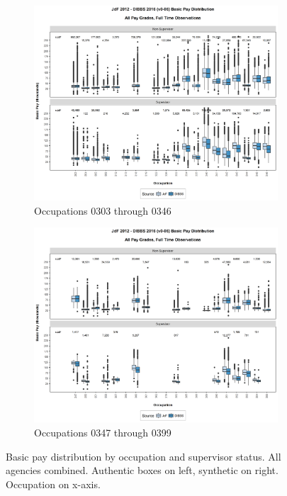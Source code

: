 \documentclass[10pt, letterpaper]{article}
\begin{document}
\begin{spacing}{1.0}
\clearpage

\begin{figure}[h]
    \centering
    \begin{subfigure}{1\textwidth}
        \centering
        \includegraphics[width=6in, trim={0 1in 0 0.75in}, clip]{JdFDIBBSBasicPaySupervisoryStatusOccupation81.png}
        \caption{Occupations 0303 through 0346}
        \vspace{10pt}
    \end{subfigure}
    \begin{subfigure}{1\textwidth}
        \centering
        \includegraphics[width=6in, trim={0 1in 0 0.75in}, clip]{JdFDIBBSBasicPaySupervisoryStatusOccupation101.png}
        \caption{Occupations 0347 through 0399}
        \vspace{10pt}
    \end{subfigure}
    \caption{Basic pay distribution by occupation and supervisor status.  All agencies combined.  Authentic boxes on left, synthetic on right.  Occupation on x-axis.}
    \label{figure:JdFDIBBSBasicPaySupervisoryStatusOccupation3}
\end{figure}


\end{spacing}
\end{document}
